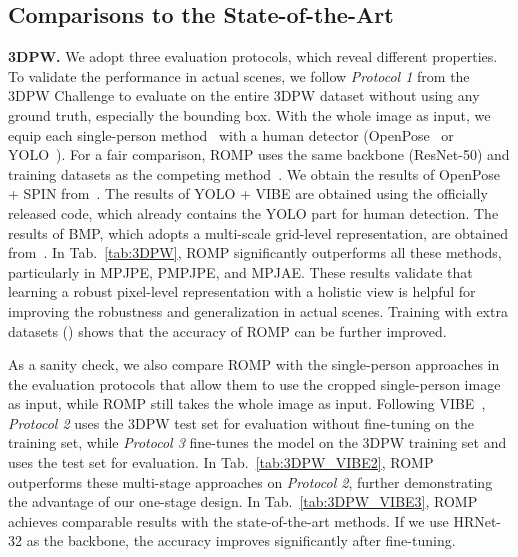 \documentclass[10pt,twocolumn,letterpaper]{article}
\begin{document}
\subsection{Comparisons to the State-of-the-Art~\label{sec:comparisons}}

\textbf{3DPW.} 
We adopt three evaluation protocols, which reveal different properties.
To validate the performance in actual scenes, we follow \textit{Protocol 1} from the 3DPW Challenge to evaluate on the entire 3DPW dataset without using any ground truth, especially the bounding box. 
With the whole image as input, we equip each single-person method~\cite{kocabas2020vibe,kolotouros2019spin} with a human detector (OpenPose~\cite{openpose} or YOLO~\cite{redmon2018yolov3}).
For a fair comparison, ROMP uses the same backbone (ResNet-50) and training datasets as the competing method~\cite{kolotouros2019spin}.
We obtain the results of  OpenPose + SPIN from~\cite{imry2020challengespin}. 
The results of YOLO + VIBE are obtained using the officially released code, which already contains the YOLO part for human detection.
The results of BMP, which adopts a multi-scale grid-level representation, are obtained from~\cite{zhang2021bmp}.
In Tab.~\ref{tab:3DPW}, ROMP significantly outperforms all these methods, particularly in MPJPE, PMPJPE, and MPJAE.
These results validate that learning a robust pixel-level representation with a holistic view is helpful for improving the robustness and generalization in actual scenes.
Training with extra datasets () shows that the accuracy of ROMP can be further improved.

As a sanity check, we also compare ROMP with the single-person approaches in the evaluation protocols that allow them to use the cropped single-person image as input, while ROMP still takes the whole image as input.
Following VIBE~\cite{kocabas2020vibe}, \textit{Protocol 2} uses the 3DPW test set for evaluation without fine-tuning on the training set, while \textit{Protocol 3} fine-tunes the model on the 3DPW training set and uses the test set for evaluation.
In Tab.~\ref{tab:3DPW_VIBE2}, ROMP outperforms these multi-stage approaches on \textit{Protocol 2}, further demonstrating the advantage of our one-stage design.
In Tab.~\ref{tab:3DPW_VIBE3}, ROMP achieves comparable results with the state-of-the-art methods. 
If we use HRNet-32 as the backbone, the accuracy improves significantly after fine-tuning. 
\end{document}
